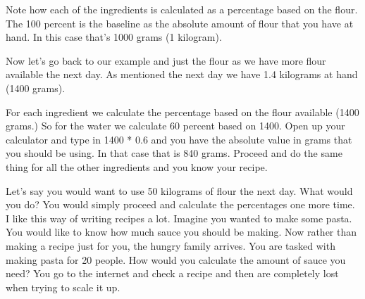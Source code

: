 Note how each of the ingredients is calculated as a percentage
based on the flour. The 100 percent is the baseline as the absolute
amount of flour that you have at hand. In this case that's 1000 grams
(1 kilogram).

Now let's go back to our example and just the flour as we have
more flour available the next day. As mentioned the next day
we have 1.4 kilograms at hand (1400 grams).

\begin{table}[H]
\centering
{}
\end{table}

For each ingredient we calculate the percentage
based on the flour available (1400 grams.) So for the water
we calculate 60 percent based on 1400. Open up your
calculator and type in 1400 * 0.6 and you have
the absolute value in grams that you should be using.
In that case that is 840 grams. Proceed and do the same
thing for all the other ingredients and you know
your recipe.

Let's say you would want to use 50 kilograms of flour
the next day. What would you do? You would simply proceed
and calculate the percentages one more time. I like this
way of writing recipes a lot. Imagine you wanted to make
some pasta. You would like to know how much sauce you should
be making. Now rather than making a recipe just for you, the
hungry family arrives. You are tasked with making pasta
for 20 people. How would you calculate the amount of sauce
you need? You go to the internet and check a recipe and then
are completely lost when trying to scale it up.

